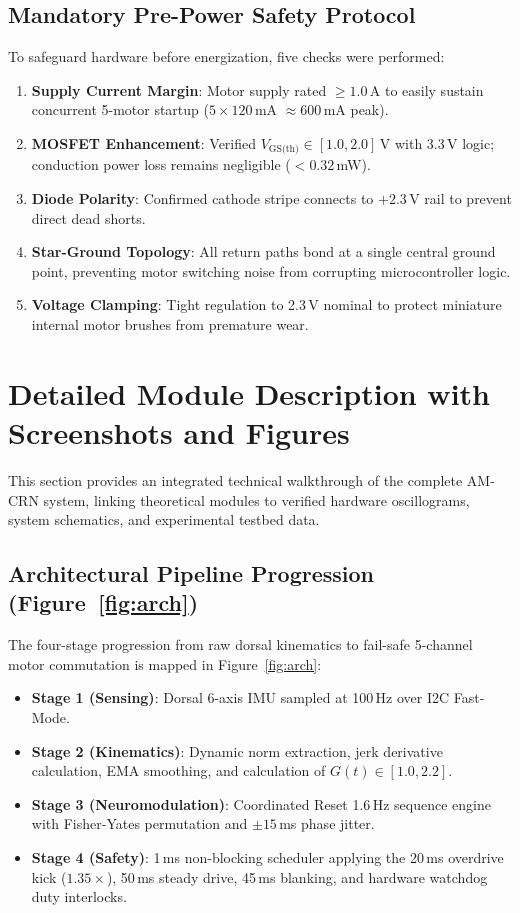 \documentclass[10pt,twocolumn]{article}
\begin{document}
\subsection{Mandatory Pre-Power Safety Protocol}
To safeguard hardware before energization, five checks were performed:
\begin{enumerate}
    \item \textbf{Supply Current Margin}: Motor supply rated $\ge 1.0$\,A to easily sustain concurrent 5-motor startup ($5 \times 120$\,mA $\approx 600$\,mA peak).
    \item \textbf{MOSFET Enhancement}: Verified $V_{\text{GS(th)}} \in [1.0, 2.0]$\,V with 3.3\,V logic; conduction power loss remains negligible ($<0.32$\,mW).
    \item \textbf{Diode Polarity}: Confirmed cathode stripe connects to $+2.3$\,V rail to prevent direct dead shorts.
    \item \textbf{Star-Ground Topology}: All return paths bond at a single central ground point, preventing motor switching noise from corrupting microcontroller logic.
    \item \textbf{Voltage Clamping}: Tight regulation to 2.3\,V nominal to protect miniature internal motor brushes from premature wear.
\end{enumerate}

\section{Detailed Module Description with Screenshots and Figures}
This section provides an integrated technical walkthrough of the complete AM-CRN system, linking theoretical modules to verified hardware oscillograms, system schematics, and experimental testbed data.

\subsection{Architectural Pipeline Progression (Figure~\ref{fig:arch})}
The four-stage progression from raw dorsal kinematics to fail-safe 5-channel motor commutation is mapped in Figure~\ref{fig:arch}:
\begin{itemize}
    \item \textbf{Stage 1 (Sensing)}: Dorsal 6-axis IMU sampled at 100\,Hz over I2C Fast-Mode.
    \item \textbf{Stage 2 (Kinematics)}: Dynamic norm extraction, jerk derivative calculation, EMA smoothing, and calculation of $G(t) \in [1.0, 2.2]$.
    \item \textbf{Stage 3 (Neuromodulation)}: Coordinated Reset 1.6\,Hz sequence engine with Fisher-Yates permutation and $\pm 15$\,ms phase jitter.
    \item \textbf{Stage 4 (Safety)}: 1\,ms non-blocking scheduler applying the 20\,ms overdrive kick ($1.35\times$), 50\,ms steady drive, 45\,ms blanking, and hardware watchdog duty interlocks.
\end{itemize}
\end{document}
